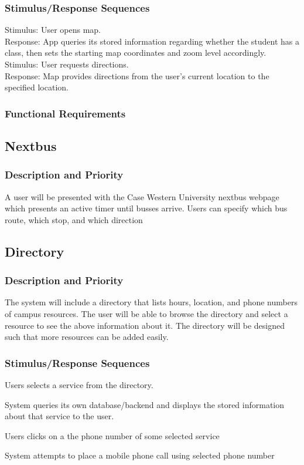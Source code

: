\documentclass[pdftex,12pt,letter]{article}
\begin{document}
\subsubsection{Stimulus/Response Sequences}
Stimulus: User opens map.\\
Response: App queries its stored information regarding whether the student has a class, then sets the starting map coordinates and zoom level accordingly.\\
Stimulus: User requests directions.\\
Response: Map provides directions from the user's current location to the specified location.\\
\subsubsection{Functional Requirements}
\subsection{Nextbus}
\subsubsection{Description and Priority}
A user will be presented with the Case Western University nextbus webpage which presents an active timer until busses arrive. Users can specify which bus route, which stop, and which direction 
\subsection{Directory}
\subsubsection{Description and Priority}
The system will include a directory that lists hours, location, and phone numbers of campus resources. The user will be able to browse the directory and select a resource to see the above information about it. The directory will be designed such that more resources can be added easily. 
\subsubsection{Stimulus/Response Sequences}
\begin{description}\itemsep1pt
\item[Stimulus:] Users selects a service from the directory.
\item[Response:] System queries its own database/backend and displays the stored information about that service to the user.
\item[Stimulus:] Users clicks on a the phone number of some selected service
\item[Response:] System attempts to place a mobile phone call using selected phone number
\end{description}
\end{document}
